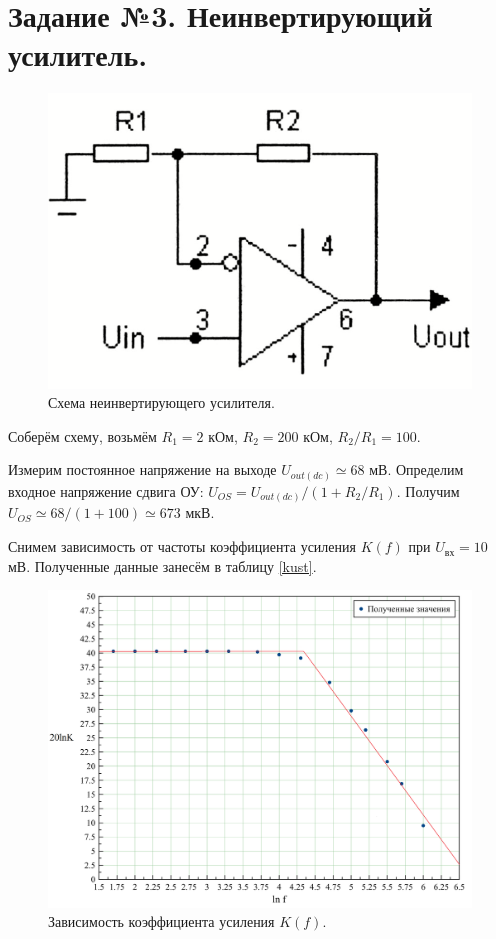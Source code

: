 \documentclass[a4paper, 12pt, twoside]{article}
\begin{document}
\section*{Задание №3. Неинвертирующий усилитель.}

\begin{figure}[H]
	\centering
	\includegraphics[width =  0.3\linewidth]{nus}
	\caption{Схема неинвертирующего усилителя.}
	\label{nus}
\end{figure}

Соберём схему, возьмём $R_1 = 2$ кОм, $R_2 = 200$ кОм, $R_2/R_1 = 100$.
\vspace{\baselineskip}

Измерим постоянное напряжение на выходе $U_{out(dc)} \simeq 68$ мВ. Определим входное напряжение сдвига ОУ: $U_{OS} = U_{out(dc)}/(1+R_2/R_1).$ Получим $U_{OS} \simeq 68/(1 + 100)\simeq 673$ мкВ.
\vspace{\baselineskip}

Снимем зависимость от частоты коэффициента усиления $K(f)$ при $U_{\text{вх}} = 10$ мВ. Полученные данные занесём в таблицу \ref{kust}.

\begin{table}[H]
	\centering
	\caption{Зависимость коэффициента усиления $K(f)$.}
	\label{kust}
\end{table}

\begin{figure}[H]
	\centering
	\includegraphics[width =  0.7\linewidth]{3}
	\caption{Зависимость коэффициента усиления $K(f)$.}
	\label{kf}
\end{figure}
\end{document}
